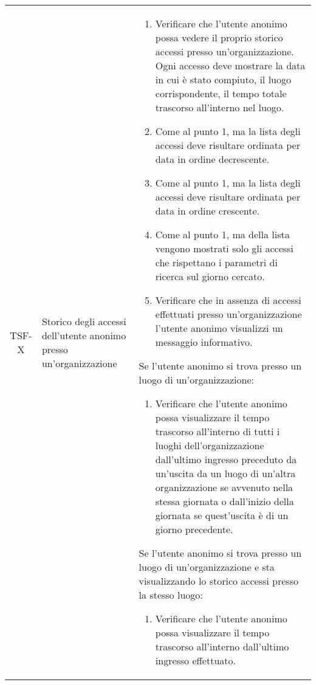 {\begin{longtable}{ c | C{3cm} | C{11cm} }
TSF-X & Storico degli accessi dell'utente anonimo presso un'organizzazione & \begin{enumerate}
    \item Verificare che l'utente anonimo possa vedere il proprio storico accessi presso un'organizzazione. Ogni accesso deve mostrare la data in cui è stato compiuto, il luogo corrispondente, il tempo totale trascorso all'interno nel luogo.
    \item Come al punto 1, ma la lista degli accessi deve risultare ordinata per data in ordine decrescente.
    \item Come al punto 1, ma la lista degli accessi deve risultare ordinata per data in ordine crescente.
    \item Come al punto 1, ma della lista vengono mostrati solo gli accessi che rispettano i parametri di ricerca sul giorno cercato.
    \item Verificare che in assenza di accessi effettuati presso un'organizzazione l'utente anonimo visualizzi un messaggio informativo.
\end{enumerate}
Se l'utente anonimo si trova presso un luogo di un'organizzazione:
\begin{enumerate}
    \item Verificare che l'utente anonimo possa visualizzare il tempo trascorso all'interno di tutti i luoghi dell'organizzazione dall'ultimo ingresso preceduto da un'uscita da un luogo di un'altra organizzazione se avvenuto nella stessa giornata o dall'inizio della giornata se quest'uscita è di un giorno precedente. %
\end{enumerate}
Se l'utente anonimo si trova presso un luogo di un'organizzazione e sta visualizzando lo storico accessi presso la stesso luogo:
\begin{enumerate}
    \item Verificare che l'utente anonimo possa visualizzare il tempo trascorso all'interno dall'ultimo ingresso effettuato.
\end{enumerate} \\


\end{longtable}}
